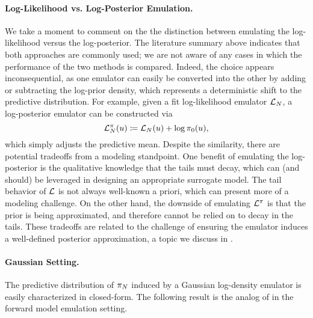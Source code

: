 \documentclass[12pt]{article}
\begin{document}
\paragraph{Log-Likelihood vs. Log-Posterior Emulation.} \label{sec:llik_vs_lpost}
We take a moment to comment on the the distinction between emulating the log-likelihood versus
the log-posterior. The literature summary above indicates that both approaches are commonly used;
we are not aware of any cases in which the performance of the two methods is compared. 
Indeed, the choice appears inconsequential, as one emulator can easily be converted into the other 
by adding or subtracting the log-prior density, which represents a deterministic shift to the predictive 
distribution. For example, given a fit log-likelihood emulator $\llikEm[\Ndesign]$, a log-posterior emulator 
can be constructed via
\begin{equation}
\lpostEm[\Ndesign](\Par) \Def \llikEm[\Ndesign](\Par) + \log \priorDens(\Par),
\end{equation}
which simply adjusts the predictive mean. Despite the similarity, there are potential tradeoffs from 
a modeling standpoint. One benefit of emulating the log-posterior is the qualitative knowledge 
that the tails must decay, which can (and should) be leveraged in designing an appropriate 
surrogate model. The tail behavior of $\llik$ is not always well-known a priori, which can 
present more of a modeling challenge. On the other hand, the downside of emulating $\lpost$ is
that the prior is being approximated, and therefore cannot be relied on to decay in the tails.
These tradeoffs are related to the challenge of ensuring the emulator induces a well-defined
posterior approximation, a topic we discuss in . 

\paragraph{Gaussian Setting.} \label{ldens_Gaussian}
The predictive distribution of $\postEm[\Ndesign]$ induced
by a Gaussian log-density emulator is easily characterized in closed-form. 
The following result is the analog of  in the forward model 
emulation setting.
\end{document}
